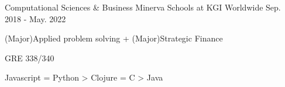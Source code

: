 \begin{cventries}
  \cventry
    {Computational Sciences \& Business}
    {Minerva Schools at KGI}
    {Worldwide}
    {Sep. 2018 - May. 2022}
    {
      \begin{cvitems}
        \item {(Major)Applied problem solving + (Major)Strategic Finance}
        \item {GRE 338/340}
        \item {Javascript = Python > Clojure = C > Java}
      \end{cvitems}
    }
\end{cventries}
